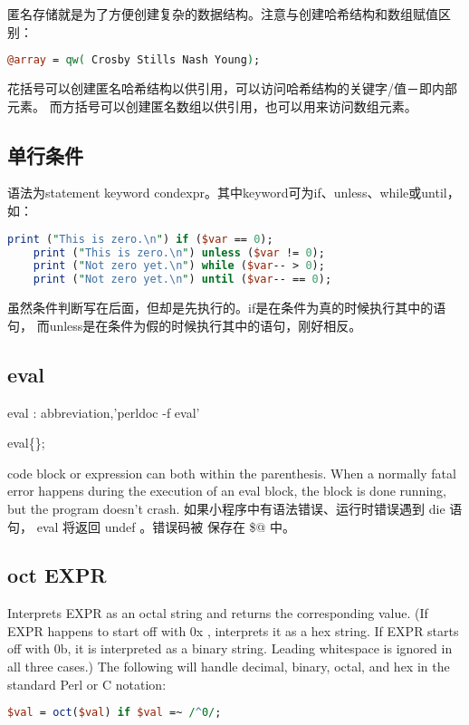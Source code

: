 \documentclass[a4paper,11pt]{book}
\begin{document}
匿名存储就是为了方便创建复杂的数据结构。注意与创建哈希结构和数组赋值区别：
\begin{lstlisting}[language=perl]
%hash = (phone => 'Bell', light => 'Edison');
@array = qw( Crosby Stills Nash Young);
\end{lstlisting}
花括号可以创建匿名哈希结构以供引用，可以访问哈希结构的关键字/值－即内部元素。
而方括号可以创建匿名数组以供引用，也可以用来访问数组元素。

\subsection{单行条件 }
  语法为statement keyword condexpr。其中keyword可为if、unless、while或until，
如：
\begin{lstlisting}[language=perl]
    print ("This is zero.\n") if ($var == 0);
    print ("This is zero.\n") unless ($var != 0);
    print ("Not zero yet.\n") while ($var-- > 0);
    print ("Not zero yet.\n") until ($var-- == 0);
\end{lstlisting}
  虽然条件判断写在后面，但却是先执行的。if是在条件为真的时候执行其中的语句，
  而unless是在条件为假的时候执行其中的语句，刚好相反。
\subsection{eval}
eval : abbreviation,’perldoc -f eval’ 

eval\{\};

code block or expression can both within the parenthesis.
When a normally fatal error happens during the execution of an eval block, 
the block is done running, but the program doesn't crash. 
如果小程序中有语法错误、运行时错误遇到 die 语句， eval 将返回 undef 。错误码被
保存在 \$@ 中。 

\subsection{oct EXPR }
Interprets EXPR as an octal string and returns the corresponding value. (If 
EXPR happens to start off with 0x , interprets it as a hex string. If EXPR 
starts off with 0b, it is interpreted as a binary string. Leading whitespace 
is ignored in all three cases.) The following will handle decimal, binary, 
octal, and hex in the standard Perl or C notation:
\begin{lstlisting}[language=perl]
    $val = oct($val) if $val =~ /^0/;
\end{lstlisting}
\end{document}
